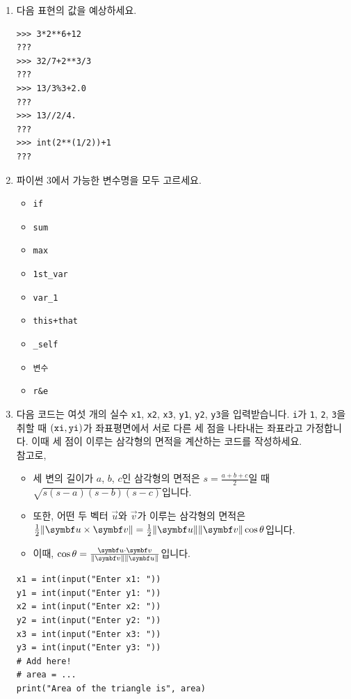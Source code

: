 \documentclass[../main.tex]{subfiles}
\begin{document}
\begin{enumerate}
  \item 다음 표현의 값을 예상하세요.
    \begin{verbatim}
>>> 3*2**6+12
???
>>> 32/7+2**3/3
???
>>> 13/3%3+2.0
???
>>> 13//2/4.
???
>>> int(2**(1/2))+1
???
    \end{verbatim}

  \item 파이썬 3에서 가능한 변수명을 모두 고르세요.
    \begin{itemize}
      \item \texttt{if}
      \item \texttt{sum}
      \item \texttt{max}
      \item \texttt{1st\_var}
      \item \texttt{var\_1}
      \item \texttt{this+that}
      \item \texttt{\_self}
      \item \texttt{변수}
      \item \texttt{r\&e}
    \end{itemize}

  \item 다음 코드는 여섯 개의 실수 \verb|x1|, \verb|x2|, \verb|x3|, \verb|y1|,
    \verb|y2|, \verb|y3|을 입력받습니다.
    \verb|i|가 \verb|1|, \verb|2|, \verb|3|을 취할 때 $(\verb|xi|,
    \verb|yi|)$가 좌표평면에서 서로 다른 세 점을 나타내는 좌표라고 가정합니다.
    이때 세 점이 이루는 삼각형의 면적을 계산하는 코드를 작성하세요.\\
    참고로,
    \begin{itemize}
      \small
      \item 세 변의 길이가 $a$, $b$, $c$인 삼각형의 면적은 $s = \frac{a + b +
        c}{2}$일 때 $\sqrt{s(s - a)(s - b)(s - c)}$입니다.
      \item 또한, 어떤 두 벡터 $\vec{u}$와 $\vec{v}$가 이루는 삼각형의 면적은
        $\frac12 \norm{\vec{u} \times \vec{v}} = \frac12 \norm{\vec{u}}
        \norm{\vec{v}} \cos \theta$입니다.
      \item 이때, $\cos \theta = \frac{\vec{u} \cdot \vec{v}}{\norm{\vec{v}}
    \norm{\vec{u}}}$입니다.
    \end{itemize}
    \begin{verbatim}
x1 = int(input("Enter x1: "))
y1 = int(input("Enter y1: "))
x2 = int(input("Enter x2: "))
y2 = int(input("Enter y2: "))
x3 = int(input("Enter x3: "))
y3 = int(input("Enter y3: "))
# Add here!
# area = ...
print("Area of the triangle is", area)
    \end{verbatim}


\end{enumerate}
\end{document}

